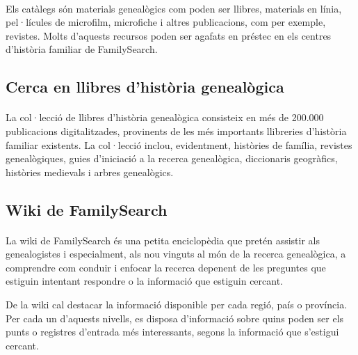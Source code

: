         \paragraph{}
        Els catàlegs són materials genealògics com poden ser llibres, materials en línia, pel·lícules de microfilm, microfiche i altres publicacions, com per exemple, revistes. Molts d’aquests recursos poden ser agafats en préstec en els centres d’història familiar de FamilySearch.


    \subsection{Cerca en llibres d'història genealògica}

        \paragraph{}
        La col·lecció de llibres d’història genealògica consisteix en més de 200.000 pu\-bli\-ca\-cions digitalitzades, provinents de les més importants llibreries d’història fa\-mi\-liar e\-xis\-tents. La col·lecció inclou, evidentment, històries de família, revistes ge\-nea\-lò\-gi\-ques, guies d’iniciació a la recerca genealògica, diccionaris geogràfics, històries medievals i arbres genealògics.


    \subsection{Wiki de FamilySearch}

        \paragraph{}
        La wiki de FamilySearch és una petita enciclopèdia que pretén assistir als genealogistes i especialment, als nou vinguts al món de la recerca genealògica, a comprendre com conduir i enfocar la recerca depenent de les preguntes que estiguin intentant respondre o la informació que estiguin cercant.

        De la wiki cal destacar la informació disponible per cada regió, país o província. Per cada un d'aquests nivells, es disposa d'informació sobre quins poden ser els punts o registres d’entrada més interessants, segons la informació que s'estigui cercant.
